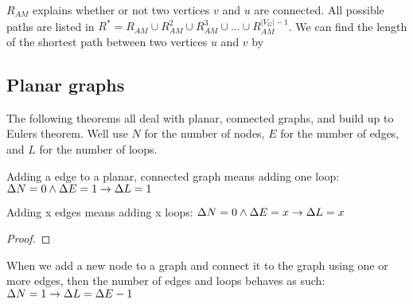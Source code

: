 \begin{theorem} \label{all_possible_paths}
    $R_{AM}$ explains whether or not two vertices $v$ and $u$ are connected. All possible paths are listed in $R^* = R_{AM} \cup R_{AM}^2 \cup R_{AM}^3 \cup ... \cup R_{AM}^{|V_G|-1}$.
    We can find the length of the shortest path between two vertices $u$ and $v$ by
\end{theorem}



\subsection{Planar graphs}

The following theorems all deal with planar, connected graphs, and build up to Eulers theorem. Well use $N$ for the number of nodes, $E$ for the number of edges, and $L$ for the number of loops.

\begin{theorem}
    Adding a edge to a planar, connected graph means adding one loop: $ \Delta N = 0 \land \Delta E = 1 \to \Delta L = 1$
\end{theorem}

\begin{theorem}
    Adding x edges means adding x loops: $ \Delta N = 0 \land \Delta E = x \to \Delta L = x $
\end{theorem}

\begin{proof}
\end{proof}

\begin{theorem}
    When we add a new node to a graph and connect it to the graph using one or more edges, then the number of edges and loops behaves as such: $ \Delta N = 1 \to \Delta L = \Delta E - 1 $
\end{theorem}

